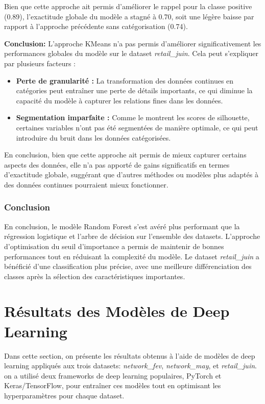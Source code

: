 Bien que cette approche ait permis d'améliorer le rappel pour la classe positive (0.89), l'exactitude globale du modèle a stagné à 0.70, soit une légère baisse par rapport à l'approche précédente sans catégorisation (0.74). 

\textbf{Conclusion:} L'approche KMeans n'a pas permis d'améliorer significativement les performances globales du modèle sur le dataset \textit{retail\_juin}. Cela peut s'expliquer par plusieurs facteurs :

\begin{itemize}
    \item \textbf{Perte de granularité :} La transformation des données continues en catégories peut entraîner une perte de détails importants, ce qui diminue la capacité du modèle à capturer les relations fines dans les données.
    \item \textbf{Segmentation imparfaite :} Comme le montrent les scores de silhouette, certaines variables n'ont pas été segmentées de manière optimale, ce qui peut introduire du bruit dans les données catégorisées.
\end{itemize}

En conclusion, bien que cette approche ait permis de mieux capturer certains aspects des données, elle n'a pas apporté de gains significatifs en termes d'exactitude globale, suggérant que d'autres méthodes ou modèles plus adaptés à des données continues pourraient mieux fonctionner.

\subsubsection{Conclusion}

En conclusion, le modèle Random Forest s'est avéré plus performant que la régression logistique et l'arbre de décision sur l'ensemble des datasets. L'approche d'optimisation du seuil d'importance a permis de maintenir de bonnes performances tout en réduisant la complexité du modèle. Le dataset \textit{retail\_juin} a bénéficié d'une classification plus précise, avec une meilleure différenciation des classes après la sélection des caractéristiques importantes.

\section{Résultats des Modèles de Deep Learning}

Dans cette section, on présente les résultats obtenus à l'aide de modèles de deep learning appliqués aux trois datasets: \textit{network\_fev}, \textit{network\_may}, et \textit{retail\_juin}. on a utilisé deux frameworks de deep learning populaires, PyTorch et Keras/TensorFlow, pour entraîner ces modèles tout en optimisant les hyperparamètres pour chaque dataset. 

